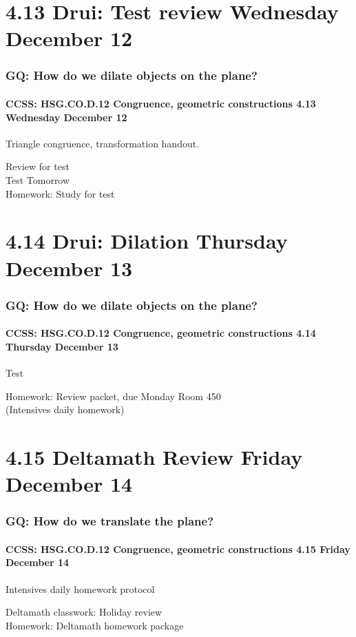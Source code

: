 \documentclass{beamer}
\begin{document}
  \section{4.13 Drui: Test review Wednesday December 12}
    \frame
    {
      \frametitle{GQ: How do we dilate objects on the plane?}
      \framesubtitle{CCSS: HSG.CO.D.12 Congruence, geometric constructions  \alert{4.13 Wednesday December 12}}

      \begin{block}{Triangle congruence, transformation handout.}
      \end{block} \vspace{0.5cm}
      Review for test\\[0.5cm]
      \alert{Test Tomorrow} \\[0.5cm]
      Homework: Study for test
    }

  \section{4.14 Drui: Dilation Thursday December 13}
    \frame
    {
      \frametitle{GQ: How do we dilate objects on the plane?}
      \framesubtitle{CCSS: HSG.CO.D.12 Congruence, geometric constructions  \alert{4.14 Thursday December 13}}

      \begin{block}{\centering Test}
      \end{block} \vspace{0.5cm}
      Homework: Review packet, due Monday Room 450\\[0.5cm]
      (Intensives daily homework)
    }

  \section{4.15 Deltamath Review Friday December 14}
    \frame
    {
      \frametitle{GQ: How do we translate the plane?}
      \framesubtitle{CCSS: HSG.CO.D.12 Congruence, geometric constructions  \alert{4.15 Friday December 14}}

      \begin{block}{Intensives daily homework protocol}
      \end{block}
      Deltamath classwork: Holiday review\\[0.5cm]
      Homework: Deltamath homework package
    }
\end{document}
